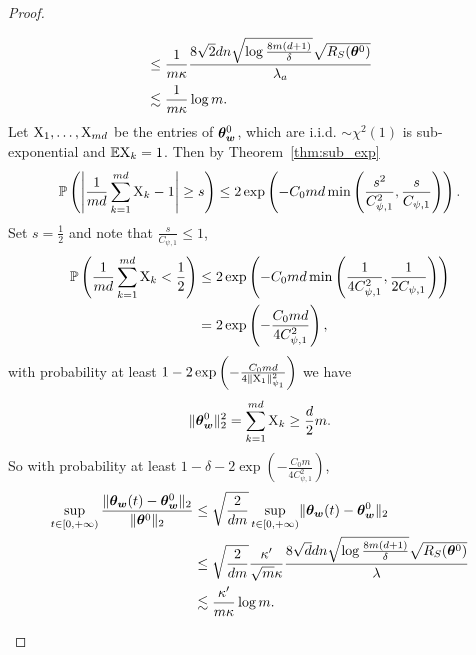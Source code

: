 \documentclass{article}
\begin{document}
\begin{proof}
\begin{enumerate}[(a)]
\begin{equation}
\begin{aligned}
                       & \leq \frac{1}{m\kappa}\frac{8\sqrt{2}dn\sqrt{\log\frac{8m(d+1)}{\delta}}\sqrt{R_S(\bm{\theta}^0)}}{\lambda_a}                             \\
                       & \lesssim \frac{1}{m\kappa}\log m.
                  \end{aligned}
              \end{equation}
              Let $\textnormal{X}_1, \ldots, \textnormal{X}_{md}$ be the entries of $\bm{\theta}_{\bm{w}}^0$, which are i.i.d. $\sim\chi^2(1)$ is sub-exponential and $\mathbb{E}\textnormal{X}_k=1$. Then by Theorem~\ref{thm:sub_exp}
              \begin{equation}
                  \mathbb{P}\left(\left\lvert\frac{1}{md}\sum_{k=1}^{md}\textnormal{X}_k-1\right\rvert\geq s\right)\leq 2\exp\left(-C_0 md \min\left(\frac{s^2}{C^2_{\psi,1}},\frac{s}{C_{\psi,1}}\right)\right).
              \end{equation}
              Set $s=\frac{1}{2}$ and note that $\frac{s}{C_{\psi,1}}\leq 1$,
              \begin{equation}
                  \begin{aligned}
                      \mathbb{P}\left(\frac{1}{md}\sum_{k=1}^{md}\textnormal{X}_k<\frac{1}{2}\right)
                       & \leq 2\exp\left(-C_0 md \min\left(\frac{1}{4C^2_{\psi,1}},\frac{1}{2C_{\psi,1}}\right)\right) \\
                       & =2\exp\left(-\frac{C_0md}{4C^2_{\psi,1}}\right),
                  \end{aligned}
              \end{equation}
              with probability at least $1-2\exp\left(-\frac{C_0md}{4\lVert\textnormal{X}_1\rVert^2_{\psi_1}}\right)$ we have
              \begin{equation}
                  \lVert\bm{\theta}_{\bm{w}}^0\rVert^2_2=\sum_{k=1}^{md}\textnormal{X}_k\geq\frac{d}{2}m.
              \end{equation}
              So with probability at least $1-\delta-2\exp\left(-\frac{C_0m}{4C^2_{\psi,1}}\right)$,
              \begin{equation}
                  \begin{aligned}
                      \sup\limits_{t\in[0,+\infty)}\frac{\lVert\bm{\theta}_{\bm{w}}(t)-\bm{\theta}_{\bm{w}}^0\rVert_2}{\lVert\bm{\theta}^0\rVert_2}
                       & \leq \sqrt{\frac{2}{dm}}\sup\limits_{t\in[0,+\infty)}\lVert\bm{\theta}_{\bm{w}}(t)-\bm{\theta}_{\bm{w}}^0\rVert_2                                                                   \\
                       & \leq  \sqrt{\frac{2}{dm}}\frac{\kappa'}{\sqrt{m}\kappa}\frac{8\sqrt{d}dn\sqrt{\log\frac{8m(d+1)}{\delta}}\sqrt{R_S(\bm{\theta}^0)}}{\lambda} \\
                       & \lesssim \frac{\kappa'}{m\kappa}\log m.
                  \end{aligned}
              \end{equation}
    \end{enumerate}
\end{proof}
\end{document}
